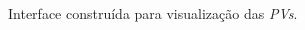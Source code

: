 \begin{frame}
\begin{columns}
\begin{column}{.5\textwidth}
\begin{figure}[h]
    \caption {Interface construída para visualização das
    \textit{PVs}.}
    \label{img:ntp-opi} 
\end{figure}
\end{column} 
\end{columns}

\end{frame}